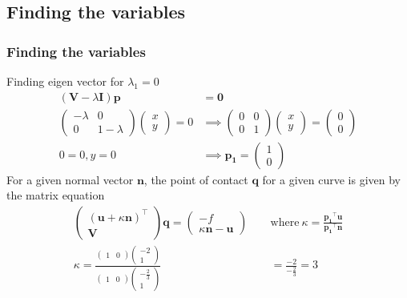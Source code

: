 \documentclass{beamer}
\providecommand{\brak}[1]{\ensuremath{\left(#1\right)}}
\theoremstyle{remark}
\newcommand{\myvec}[1]{\ensuremath{\begin{pmatrix}#1\end{pmatrix}}}
\let\vec\mathbf
\numberwithin{equation}{section}
\begin{document}
 \subsection{Finding the variables}
\begin{frame}
\frametitle{Finding the variables}
Finding eigen vector for $\lambda_1=0$
\begin{align}
    \brak{\vec{V}- \lambda\vec{I}}\vec{p}&=\vec{0}\\
    \myvec{-\lambda&0\\0&1-\lambda}\myvec{x\\y}=0 &\implies \myvec{0&0\\0&1}\myvec{x\\y}=\myvec{0\\0}\\
     0=0,y=0 &\implies \vec{p_1}=\myvec{1\\0}
\end{align}
For a given normal vector $\vec{n}$, the point of contact $\vec{q}$ for a given curve is given by the matrix equation
\begin{align}
\myvec{\brak{\vec{u}+\kappa\vec{n}}^\top\\\vec{V}}\vec{q}=\myvec{-f\\\kappa\vec{n}-\vec{u}} \quad\ &\text{where}\ \kappa=\frac{\vec{p_1}^\top\vec{u}}{\vec{p_1}^\top\vec{n}} \\
\kappa=\frac{\myvec{1&0}\myvec{-2\\1}}{\myvec{1&0}\myvec{-\frac{2}{3}\\1}}&=\frac{-2}{-\frac{2}{3}}=3
\end{align}
 \end{frame}
\end{document}
